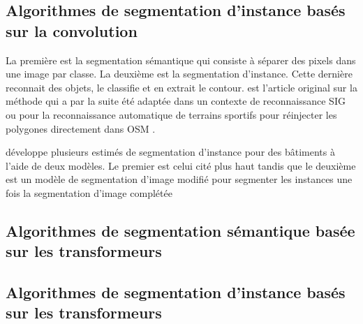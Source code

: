   \subsection{Algorithmes de segmentation d'instance basés sur la convolution}
  La première est la segmentation sémantique qui consiste à séparer des pixels dans une image par classe. La deuxième est la segmentation d'instance. Cette dernière reconnait des objets, le classifie et en extrait le contour. \textcite{he_mask_2018} est l'article original sur la méthode qui a par la suite été adaptée dans un contexte de reconnaissance SIG \parencite{pesek_mask_2018} ou pour la reconnaissance automatique de terrains sportifs pour réinjecter les polygones directement dans \ac{OSM} \parencite{remillard_jremillardimages--osm_2024}.\par
  \textcite{fritz_instance_2020} développe plusieurs estimés de segmentation d'instance pour des bâtiments à l'aide de deux modèles. Le premier est celui cité plus haut\parencite{he_mask_2018} tandis que le deuxième est un modèle de segmentation d'image modifié pour segmenter les instances \parencite{iglovikov_ternausnetv2_2018} une fois la segmentation d'image complétée
  \subsection{Algorithmes de segmentation sémantique basée sur les transformeurs}
  \subsection{Algorithmes de segmentation d'instance basés sur les transformeurs}
